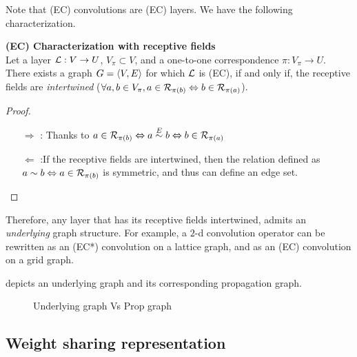 Note that (EC) convolutions are (EC) layers. We have the following characterization.

\begin{proposition}\textbf{(EC) Characterization with receptive fields}\\
Let a layer $\mathcal{L}: V \rightarrow U$, $V_\pi \subset V$, and a one-to-one correspondence $\pi: V_\pi \rightarrow U$. There exists a graph $G = \langle V, E \rangle$ for which $\mathcal{L}$ is (EC), if and only if, the receptive fields are \emph{intertwined} (\ie $\forall a,b \in V_\pi, a \in \mathcal{R}_{\pi(b)} \Leftrightarrow b \in \mathcal{R}_{\pi(a)} $).
\end{proposition}
\begin{proof}
\begin{enumerate}
  \item[$\Rightarrow$]: Thanks to $a \in \mathcal{R}_{\pi(b)} \Leftrightarrow a \overset{E}\sim b \Leftrightarrow b \in \mathcal{R}_{\pi(a)}$
  \item[$\Leftarrow$]:If the receptive fields are intertwined, then the relation defined as $a \sim b \Leftrightarrow a \in \mathcal{R}_{\pi(b)}$ is symmetric, and thus can define an edge set.
\end{enumerate}
\end{proof}

Therefore, any layer that has its receptive fields intertwined, admits an \emph{underlying} graph structure. For example, a $2$-d convolution operator can be rewritten as an (EC*) convolution on a lattice graph, and as an (EC) convolution on a grid graph.

 depicts an underlying graph and its corresponding propagation graph.

\begin{figure}[H]
\centering
{}
\caption{Underlying graph Vs Prop graph}
\label{fig:upgraph}
\end{figure}

\subsection{Weight sharing representation}

